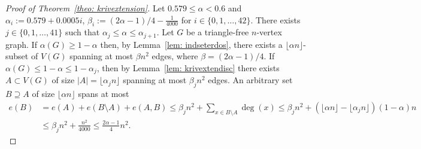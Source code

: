 \documentclass[11pt]{article}
\theoremstyle{definition}
\numberwithin{theo}{section}
\begin{document}
\begin{proof}[Proof of Theorem~\ref{theo: krivextension}]
Let $0.579\leq \alpha<0.6$ and $\alpha_i:=0.579+0.0005i$, $\beta_i:=(2\alpha-1)/4-\frac{1}{4000}$ for $i\in \{0,1,\ldots,42\}$. There exists $j\in\{0,1,\ldots,41\}$ such that $\alpha_j\leq \alpha\leq \alpha_{j+1}$. Let $G$ be a triangle-free $n$-vertex graph. If $\alpha(G)\geq 1-\alpha$ then, by Lemma~\ref{lem: indseterdos}, there exists a $\lfloor \alpha n\rfloor$-subset of $V(G)$ spanning at most $\beta n^2$ edges, where $\beta=(2\alpha-1)/4$. If $\alpha(G)\leq 1-\alpha\leq 1-\alpha_j$, then by Lemma~\ref{lem: krivextendisc} there exists $A\subset V(G)$ of size $|A|=\lfloor \alpha_j n\rfloor$ spanning at most $\beta_j n^2$ edges. An arbitrary set $B\supseteq A$ of size $\lfloor \alpha n\rfloor$ spans at most
\begin{align*}
e(B)&=
    e(A)+e(B\setminus A)+e(A,B)\leq \beta_j n^2+\sum_{x\in B\setminus A}\deg(x) \leq \beta_j n^2+ \left(\lfloor \alpha n\rfloor-\lfloor \alpha_j n\rfloor\right)(1-\alpha)n \\
    &\leq \beta_j n^2+\frac{n^2}{4000}\leq \frac{2\alpha-1}{4}n^2.
\end{align*}
\end{proof}
\end{document}
